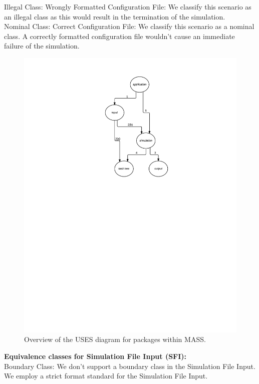 \begin{enumerate}
\begin{itemize}
\begin{itemize}
Illegal Class: Wrongly Formatted Configuration File: We classify this scenario as an illegal class as this would result in the termination of the simulation. \\

Nominal Class: Correct Configuration File: We classify this scenario as a nominal class. A correctly formatted configuration file wouldn't cause an immediate failure of the simulation. \\

\begin{figure}[H]
\centering
\includegraphics[trim=3.5cm 15.5cm 0cm 0cm, width=8.0in]{figs/OverviewUsesDiagram}
\caption{Overview of the USES diagram for packages within MASS.}
\label{fig:OverviewUsesDiagram }
\end{figure}

\textbf{Equivalence classes for Simulation File Input (SFI):} \\
Boundary Class: We don't support a boundary class in the Simulation File Input. We employ a strict format standard for the Simulation File Input. \\


\end{itemize}
\end{itemize}
\end{enumerate}
